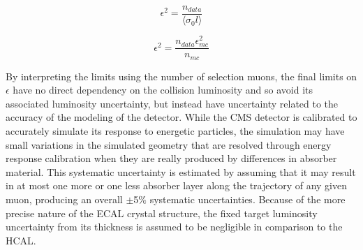 \begin{equation}
	\label{eq:datarate}
	\epsilon^2 = \frac{n_{data}}{\langle \sigma_0 l\rangle}
\end{equation}

\begin{equation}
	\label{eq:fixedLumi}
	\epsilon^2 = \frac{n_{data}\epsilon_{mc}^2}{n_{mc}}  
\end{equation}

By interpreting the limits using the number of selection muons, the final limits on $\epsilon$ have no direct dependency on the collision luminosity and so avoid its associated luminosity uncertainty, but instead have uncertainty related to the accuracy of the modeling of the detector.
While the CMS detector is calibrated to accurately simulate its response to energetic particles, the simulation may have small variations in the simulated geometry that are resolved through energy response calibration when they are really produced by differences in absorber material.
This systematic uncertainty is estimated by assuming that it may result in at most one more or one less absorber layer along the trajectory of any given muon, producing an overall $\pm$5$\%$ systematic uncertainties.
Because of the more precise nature of the ECAL crystal structure, the fixed target luminosity uncertainty from its thickness is assumed to be negligible in comparison to the HCAL.
